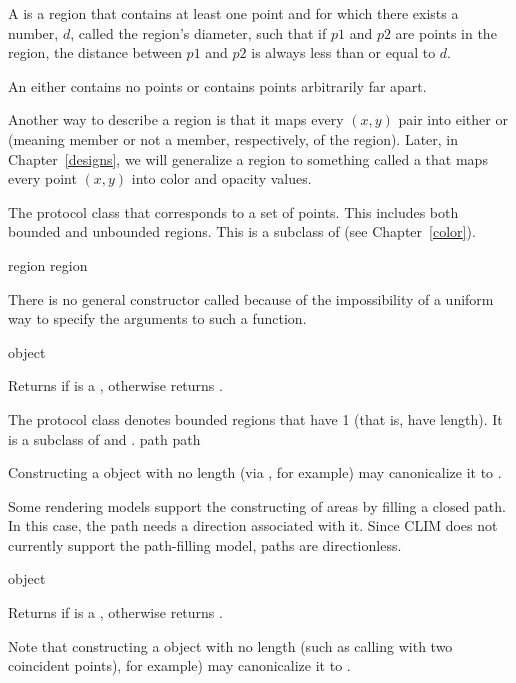 A  is a region that contains at least one point and for
which there exists a number, $d$, called the region's diameter, such that if
$p1$ and $p2$ are points in the region, the distance between $p1$ and $p2$ is
always less than or equal to $d$.

An  either contains no points or contains points
arbitrarily far apart.

Another way to describe a region is that it maps every $(x,y)$ pair into either
 or  (meaning member or not a member, respectively, of
the region).  Later, in Chapter~\ref{designs}, we will generalize a region to
something called a  that maps every point $(x,y)$ into color and
opacity values.


The protocol class that corresponds to a set of points.  This includes both
bounded and unbounded regions.  This is a subclass of  (see
Chapter~\ref{color}).

 {region} {region}

There is no general constructor called  because of the
impossibility of a uniform way to specify the arguments to such a function.

 {object}

Returns  if  is a , otherwise returns
.


The protocol class  denotes bounded regions that have
 1 (that is, have length).  It is a subclass of
 and .
 {path} {path}

Constructing a  object with no length (via , for
example) may canonicalize it to .

Some rendering models support the constructing of areas by filling a closed
path.  In this case, the path needs a direction associated with it.  Since CLIM
does not currently support the path-filling model, paths are directionless.

 {object}

Returns  if  is a , otherwise returns
.

Note that constructing a  object with no length (such as calling
 with two coincident points), for example) may canonicalize it to
.

